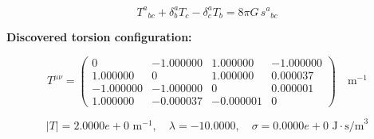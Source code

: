 
\begin{equation}
  T^a{}_{bc} + \delta^a_b T_c - \delta^a_c T_b = 8\pi G \, s^a{}_{bc}
\end{equation}

\textbf{Discovered torsion configuration:}

\begin{equation}
  T^{\mu\nu} = \begin{pmatrix}
    0 & -1.000000 & 1.000000 & -1.000000 \\
    1.000000 & 0 & 1.000000 & 0.000037 \\
    -1.000000 & -1.000000 & 0 & 0.000001 \\
    1.000000 & -0.000037 & -0.000001 & 0
  \end{pmatrix} \quad \text{m}^{-1}
\end{equation}

\begin{equation}
  |T| = 2.0000e+0 \text{ m}^{-1}, \quad
  \lambda = -10.0000, \quad
  \sigma = 0.0000e+0 \text{ J}\cdot\text{s/m}^3
\end{equation}